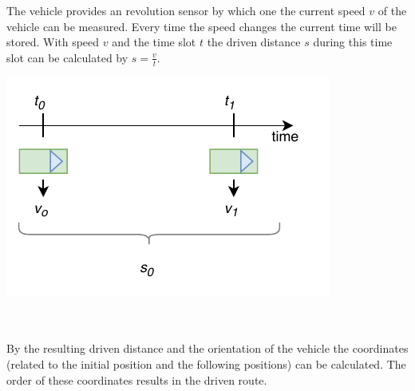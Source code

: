 \begin{minipage}{0.5\textwidth}
The vehicle provides an revolution sensor by which one the current speed $v$ of the vehicle can be measured. Every time the speed changes the current time will be stored. With speed $v$ and the time slot $t$ the driven distance $s$ during this time slot can be calculated by $s=\frac{v}{t}$.
\end{minipage}
\begin{minipage}{0.5\textwidth}
	\centering
	\includegraphics[scale=0.8]{sources/mapping/distance.pdf}
\end{minipage}
\\
\\
By the resulting driven distance and the orientation of the vehicle the coordinates (related to the initial position and the following positions) can be calculated. The order of these coordinates results in the driven route.

